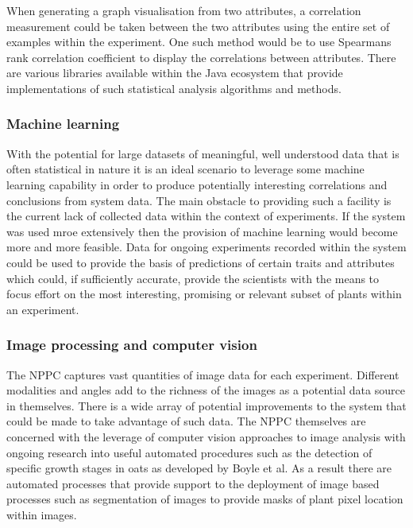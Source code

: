 When generating a graph visualisation from two attributes, a correlation measurement could be taken between the two attributes using the entire set of examples within the experiment. One such method would be to use Spearmans rank correlation coefficient\cite{spearman} to display the correlations between attributes. There are various libraries available within the Java ecosystem that provide implementations of such statistical analysis algorithms and methods. 

\subsubsection{Machine learning}
With the potential for large datasets of meaningful, well understood data that is often statistical in nature it is an ideal scenario to leverage some machine learning capability in order to produce potentially interesting correlations and conclusions from system data. The main obstacle to providing such a facility is the current lack of collected data within the context of experiments. If the system was used mroe extensively then the provision of machine learning would become more and more feasible. Data for ongoing experiments recorded within the system could be used to provide the basis of predictions of certain traits and attributes which could, if sufficiently accurate, provide the scientists with the means to focus effort on the most interesting, promising or relevant subset of plants within an experiment.



\subsubsection{Image processing and computer vision}
The NPPC captures vast quantities of image data for each experiment. Different modalities and angles add to the richness of the images as a potential data source in themselves. There is a wide array of potential improvements to the system that could be made to take advantage of such data. The NPPC themselves are concerned with the leverage of computer vision approaches to image analysis with ongoing research into useful automated procedures such as the detection of specific growth stages in oats as developed by Boyle et al\cite{boyle_image-based_2015}. As a result there are automated processes that provide support to the deployment of image based processes such as segmentation of images to provide masks of plant pixel location within images.

